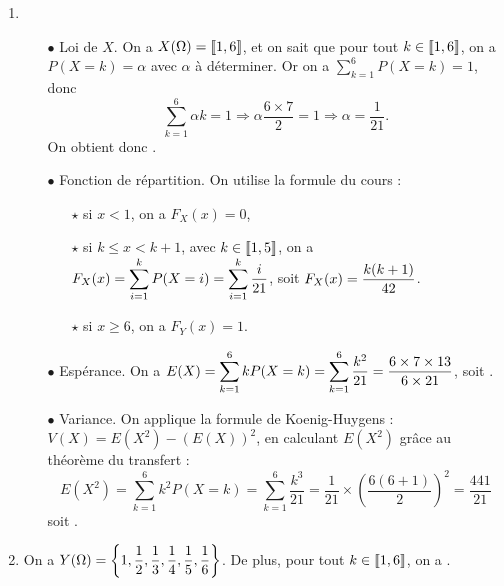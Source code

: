 \documentclass[a4paper, 11pt,reqno]{article}
\begin{document}
\begin{correction}  \;
	\begin{enumerate}
		\item
		      \begin{itemize}
			      \item[$\bullet$] Loi de $X$. On a $X(\Omega) = \llbracket  1,6\rrbracket$, et on sait que pour tout $k \in \llbracket  1,6\rrbracket$, on a $P(X=k) = \alpha$ avec $\alpha$ \`a d\'eterminer. Or on a $\sum\limits_{k=1}^6 P(X=k) = 1$, donc
				      $$\sum_{k=1}^6 \alpha k = 1 \Rightarrow  \alpha \frac{6 \times 7}{2} = 1 \Rightarrow \alpha = \frac{1}{21}.$$
				      On obtient donc .
			      \item[$\bullet$] Fonction de r\'epartition. On utilise la formule du cours :
				      \begin{itemize}
					      \item[$\star$] si $x<1$, on a $F_X(x) = 0$,
					      \item[$\star$] si $k\leq x < k+1$, avec $k\in \llbracket  1,5\rrbracket$, on a $\displaystyle F_X(x) = \sum\limits_{i=1}^k P(X=i) = \sum\limits_{i=1}^k \frac{i}{21}$, soit $\displaystyle F_X(x) = \frac{k(k+1)}{42}$.
					      \item[$\star$] si $x\geq 6$, on a $F_Y(x) = 1$.
				      \end{itemize}
			      \item[$\bullet$] Esp\'erance. On a $E(X) =\displaystyle  \sum\limits_{k=1}^6 k P(X=k) = \sum\limits_{k=1}^6 \frac{k^2}{21} =  \frac{6 \times 7 \times 13}{6\times 21}$, soit .
			      \item[$\bullet$] Variance. On applique la formule de Koenig-Huygens : $V(X) = E(X^2) - (E(X))^2$, en calculant $E(X^2)$ gr\^ace au th\'eor\`eme du transfert :
				      $$E(X^2) = \sum\limits_{k=1}^6 k^2 P(X=k) = \sum\limits_{k=1}^6 \frac{k^3}{21} = \frac{1}{21} \times \left(\frac{6(6+1)}{2}\right)^2 = \frac{441}{21}$$
				      soit  .
		      \end{itemize}
		\item On a $Y(\Omega)=\displaystyle \left\{1,\frac{1}{2},\frac{1}{3}, \frac{1}{4}, \frac{1}{5}, \frac{1}{6}\right\}$. De plus, pour tout $k\in \llbracket  1,6\rrbracket$, on a .\\

\end{enumerate}
\end{correction}
\end{document}
